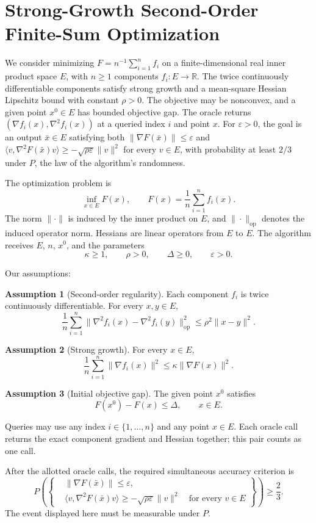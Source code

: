 \documentclass[10pt]{article}
\theoremstyle{definition}
\newtheorem{assumption}{Assumption}
\begin{document}
\section*{Strong-Growth Second-Order Finite-Sum Optimization}
We consider minimizing $F=n^{-1}\sum_{i=1}^n f_i$ on a finite-dimensional real inner product space $E$, with $n\geq1$ components $f_i:E\to\mathbb{R}$. The twice continuously differentiable components satisfy strong growth and a mean-square Hessian Lipschitz bound with constant $\rho>0$. The objective may be nonconvex, and a given point $x^0\in E$ has bounded objective gap. The oracle returns $(\nabla f_i(x),\nabla^2 f_i(x))$ at a queried index $i$ and point $x$. For $\varepsilon>0$, the goal is an output $\bar{x}\in E$ satisfying both $\|\nabla F(\bar{x})\|\leq\varepsilon$ and $\langle v,\nabla^2F(\bar{x})v\rangle\geq-\sqrt{\rho\varepsilon}\|v\|^2$ for every $v\in E$, with probability at least $2/3$ under $P$, the law of the algorithm's randomness.

The optimization problem is
\[
\inf_{x\in E} F(x),
\qquad
F(x)=\frac{1}{n}\sum_{i=1}^n f_i(x).
\]
The norm $\|\cdot\|$ is induced by the inner product on $E$, and $\|\cdot\|_{\mathrm{op}}$ denotes the induced operator norm. Hessians are linear operators from $E$ to $E$. The algorithm receives $E$, $n$, $x^0$, and the parameters
\[
\kappa\geq1,\qquad \rho>0,\qquad
\Delta\geq0,\qquad \varepsilon>0.
\]

Our assumptions:
\begin{assumption}[Second-order regularity]
Each component $f_i$ is twice continuously differentiable. For every $x,y\in E$,
\[
\frac{1}{n}\sum_{i=1}^n
\|\nabla^2 f_i(x)-\nabla^2 f_i(y)\|_{\mathrm{op}}^2
\leq \rho^2\|x-y\|^2.
\]
\end{assumption}

\begin{assumption}[Strong growth]
For every $x\in E$,
\[
\frac{1}{n}\sum_{i=1}^n\|\nabla f_i(x)\|^2
\leq\kappa\|\nabla F(x)\|^2.
\]
\end{assumption}

\begin{assumption}[Initial objective gap]
The given point $x^0$ satisfies
\[
F(x^0)-F(x)\leq\Delta,
\qquad x\in E.
\]
\end{assumption}

Queries may use any index $i\in\{1,\ldots,n\}$ and any point $x\in E$. Each oracle call returns the exact component gradient and Hessian together; this pair counts as one call.

After the allotted oracle calls, the required simultaneous accuracy criterion is
\[
P\!\left(
\left\{
\begin{aligned}
&\|\nabla F(\bar{x})\|\leq\varepsilon,\\
&\langle v,\nabla^2F(\bar{x})v\rangle
\geq-\sqrt{\rho\varepsilon}\|v\|^2
\quad\text{for every }v\in E
\end{aligned}
\right\}
\right)\geq\frac{2}{3}.
\]
The event displayed here must be measurable under $P$.
\end{document}
